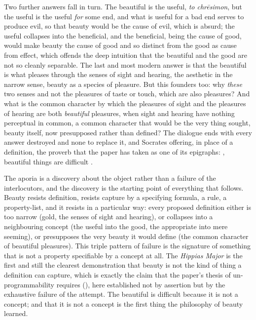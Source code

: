 Two further answers fall in turn. The beautiful is the useful, \emph{to chrēsimon}, but the useful is the useful \emph{for} some end, and what is useful for a bad end serves to produce evil, so that beauty would be the cause of evil, which is absurd; the useful collapses into the beneficial, and the beneficial, being the cause of good, would make beauty the cause of good and so distinct from the good as cause from effect, which offends the deep intuition that the beautiful and the good are not so cleanly separable. The last and most modern answer is that the beautiful is what pleases through the senses of sight and hearing, the aesthetic in the narrow sense, beauty as a species of pleasure. But this founders too: why \emph{these} two senses and not the pleasures of taste or touch, which are also pleasures? And what is the common character by which the pleasures of sight and the pleasures of hearing are both \emph{beautiful} pleasures, when sight and hearing have nothing perceptual in common, a common character that would be the very thing sought, beauty itself, now presupposed rather than defined? The dialogue ends with every answer destroyed and none to replace it, and Socrates offering, in place of a definition, the proverb that the paper has taken as one of its epigraphs: , beautiful things are difficult \parencite{plato1926}.

The aporia is a discovery about the object rather than a failure of the interlocutors, and the discovery is the starting point of everything that follows. Beauty resists definition, resists capture by a specifying formula, a rule, a property-list, and it resists in a particular way: every proposed definition either is too narrow (gold, the senses of sight and hearing), or collapses into a neighbouring concept (the useful into the good, the appropriate into mere seeming), or presupposes the very beauty it would define (the common character of beautiful pleasures). This triple pattern of failure is the signature of something that is not a property specifiable by a concept at all. The \emph{Hippias Major} is the first and still the clearest demonstration that beauty is not the kind of thing a definition can capture, which is exactly the claim that the paper's thesis of un-programmability requires (), here established not by assertion but by the exhaustive failure of the attempt. The beautiful is difficult because it is not a concept; and that it is not a concept is the first thing the philosophy of beauty learned.

